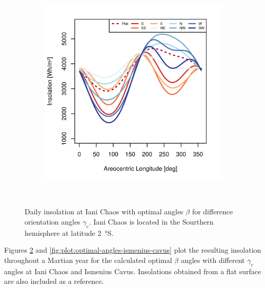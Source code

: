 \begin{figure}[h]
\begin{subfigure}[t]{\subfigureWidth}
            \includegraphics[height=\graphicsHeight]{sections/appendix/optimal-angles/plots/iani-chaos-tau-04-and-beta-optimal-based-on-solar-insolation.png}
            \label{fig:sub:optimal-angles-iani-chaos-based-on-insolation}
    \end{subfigure}\\[0.8ex]
    \caption[Daily insolation at Iani Chaos with optimal angles $\beta$ for difference orientation angles $\gamma_c$]
    {Daily insolation at Iani Chaos with optimal angles $\beta$ for difference orientation angles $\gamma_c$. Iani Chaos is located in the Sourthern hemisphere at latitude \SI{2}{\degree}S.}
    \label{fig:plot:optimal-angles-iani-chaos}
\vspace{-2ex}
\end{figure}

\clearpage

Figures \ref{fig:plot:optimal-angles-iani-chaos} and \ref{fig:plot:optimal-angles-ismenius-cavus} plot the resulting insolation throughout a Martian year for the calculated optimal $\beta$ angles with different $\gamma_{c}$ angles at Iani Chaos and Ismenius Cavus. Insolations obtained from a flat surface are also included as a reference.

